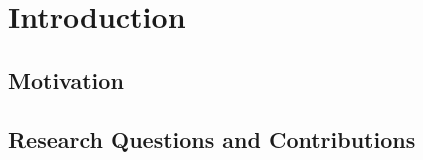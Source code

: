 \chapter{Introduction}
\label{ch:introduction}

\section{Motivation}

\section{Research Questions and Contributions}
%
%
